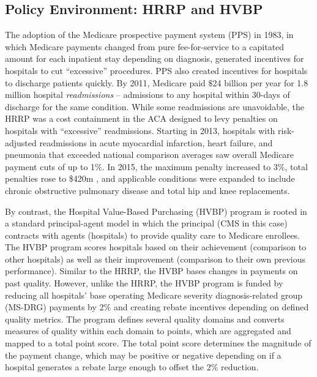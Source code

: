 \documentclass[12pt]{article}
\begin{document}
\subsection{Policy Environment: HRRP and HVBP}
The adoption of the Medicare prospective payment system (PPS) in 1983, in which Medicare payments changed from pure fee-for-service to a capitated amount for each inpatient stay depending on diagnosis, generated incentives for hospitals to cut ``excessive'' procedures. PPS also created incentives for hospitals to discharge patients quickly.  By 2011, Medicare paid $\$$24 billion per year for 1.8 million hospital \textit{readmissions} -- admissions to any hospital within 30-days of discharge for the same condition.  While some readmissions are unavoidable, the HRRP was a cost containment in the ACA designed to levy penalties on hospitals with ``excessive'' readmissions.  Starting in 2013, hospitals with risk-adjusted readmissions in acute myocardial infarction, heart failure, and pneumonia that exceeded national comparison averages saw overall Medicare payment cuts of up to 1$\%$.  In 2015, the maximum penalty increased to 3\%, total penalties rose to \$420m \citep{rau2015}, and applicable conditions were expanded to include chronic obstructive pulmonary disease and total hip and knee replacements.


By contrast, the Hospital Value-Based Purchasing (HVBP) program is rooted in a standard principal-agent model in which the principal (CMS in this case) contracts with agents (hospitals) to provide quality care to Medicare enrollees. The HVBP program scores hospitals based on their achievement (comparison to other hospitals) as well as their improvement (comparison to their own previous performance).  Similar to the HRRP, the HVBP bases changes in payments on past quality.  However, unlike the HRRP, the HVBP program is funded by reducing all hospitals' base operating Medicare severity diagnosis-related group (MS-DRG) payments by 2$\%$ and creating rebate incentives depending on defined quality metrics.  The program defines several quality domains and converts measures of quality within each domain to points, which are aggregated and mapped to a total point score.  The total point score determines the magnitude of the payment change, which may be positive or negative depending on if a hospital generates a rebate large enough to offset the 2$\%$ reduction.
\end{document}
